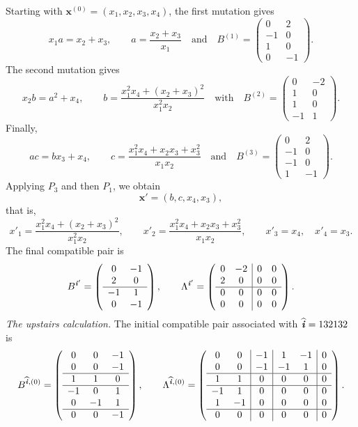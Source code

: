 \documentclass[12pt, leqno]{amsart}
\numberwithin{equation}{section}
\theoremstyle{plain}
\theoremstyle{definition}
\newcommand{\ii}{ \textbf{\textit{i}}}
\newcommand{\hii}{{\widehat{\ii}}}
\newcommand{\bfx}{\mathbf{x}}
\newcommand{\qtq}[1][{and}]{\quad\text{{#1}}\quad}
\begin{document}
Starting with $\bfx^{(0)}=(x_1,x_2,x_3,x_4)$, the first mutation gives
\[
x_1a=x_2+x_3, \qquad a=\frac{x_2+x_3}{x_1} \qtq
B^{(1)} =
\begin{pmatrix}
0&2\\
-1&0\\
1&0\\
0&-1
\end{pmatrix}.
\]
The second mutation gives
\[
x_2b=a^2+x_4, \qquad b=\frac{x_1^2x_4+(x_2+x_3)^2}{x_1^2x_2}
\quad \text{with} \quad
B^{(2)}
=
\begin{pmatrix}
0&-2\\
1&0\\
1&0\\
-1&1
\end{pmatrix}.
\]
Finally,
\[
ac=bx_3+x_4, \qquad c=\frac{x_1^2x_4+x_2x_3+x_3^2}{x_1x_2}
\qtq
B^{(3)} =
\begin{pmatrix}
0&2\\
-1&0\\
-1&0\\
1&-1
\end{pmatrix}.
\]
Applying $P_3$ and then $P_1$, we obtain
\[
\bfx'=(b,c,x_4,x_3),
\]
that is,
\[
x'_1=\frac{x_1^2x_4+(x_2+x_3)^2}{x_1^2x_2}, \qquad x'_2=\frac{x_1^2x_4+x_2x_3+x_3^2}{x_1x_2},
\qquad x'_3=x_4,\quad x'_4=x_3.
\]
The final compatible pair is
\[
B^{\ii'}
=
\left(
\begin{array}{cc}
0&-1\\
2&0\\ \hline
-1&1\\
0&-1
\end{array}
\right),
\qquad
\Lambda^{\ii'}
=
\left(
\begin{array}{cc|cc}
0&-2&0&0\\
2&0&0&0\\ \hline
0&0&0&0\\
0&0&0&0
\end{array}
\right).
\]
\smallskip
\noindent\emph{The upstairs calculation.}
The initial compatible pair associated with
$\hii=132132$ is
\[
B^{\hii,(0)}
=
\left(
\begin{array}{ccc}
0&0&-1\\
0&0&-1\\ \hline
1&1&0\\ \hline
-1&0&1\\
0&-1&1\\ \hline
0&0&-1
\end{array}
\right),
\qquad
\Lambda^{\hii,(0)}
=
\left(
\begin{array}{cc|c|cc|c}
0&0&-1&1&-1&0\\
0&0&-1&-1&1&0\\ \hline
1&1&0&0&0&0\\ \hline
-1&1&0&0&0&0\\
1&-1&0&0&0&0\\ \hline
0&0&0&0&0&0
\end{array}
\right).
\]
\end{document}
